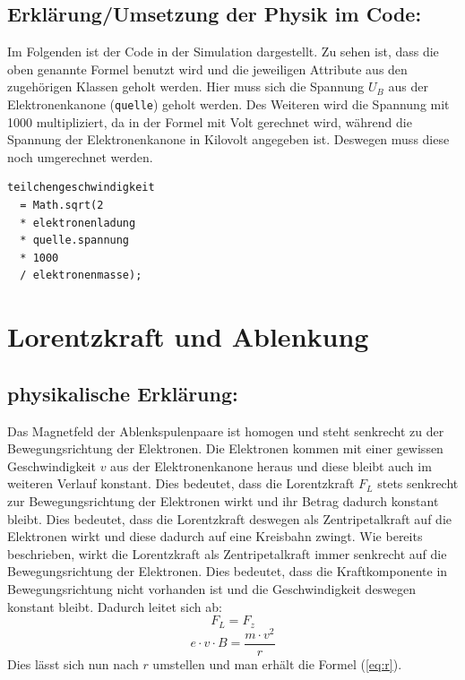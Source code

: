 \subsection{Erklärung/Umsetzung der Physik im Code:}

Im Folgenden ist der Code in der Simulation dargestellt.
Zu sehen ist, dass die oben genannte Formel benutzt wird und die jeweiligen Attribute aus den zugehörigen Klassen geholt werden.
Hier muss sich die Spannung $U_B$ aus der Elektronenkanone (\lstinline$quelle$)  geholt werden.
Des Weiteren wird die Spannung mit 1000 multipliziert, da in der Formel mit Volt gerechnet wird, während die Spannung der Elektronenkanone in Kilovolt angegeben ist. Deswegen muss diese noch umgerechnet werden.

\begin{lstlisting}
teilchengeschwindigkeit 
  = Math.sqrt(2 
  * elektronenladung 
  * quelle.spannung 
  * 1000 
  / elektronenmasse);
\end{lstlisting}

\section{Lorentzkraft und Ablenkung}

\subsection{physikalische Erklärung:}

Das Magnetfeld der Ablenkspulenpaare ist homogen und steht senkrecht zu der Bewegungsrichtung der Elektronen.
Die Elektronen kommen mit einer gewissen Geschwindigkeit $v$ aus der Elektronenkanone heraus und diese bleibt auch im weiteren Verlauf konstant.
Dies bedeutet, dass die Lorentzkraft $F_L$ stets senkrecht zur Bewegungsrichtung der Elektronen wirkt und ihr Betrag dadurch konstant bleibt.
Dies bedeutet, dass die Lorentzkraft deswegen als Zentripetalkraft auf die Elektronen wirkt und diese dadurch auf eine Kreisbahn zwingt.
Wie bereits beschrieben, wirkt die Lorentzkraft als Zentripetalkraft immer senkrecht auf die Bewegungsrichtung der Elektronen.
Dies bedeutet, dass die Kraftkomponente in Bewegungsrichtung nicht vorhanden ist und die Geschwindigkeit deswegen konstant bleibt.
Dadurch leitet sich ab: 
$$ F_L=F_z$$
$$ e \cdot v \cdot B = \frac{m \cdot v^2}{r}$$
Dies lässt sich nun nach $r$ umstellen und man erhält die Formel (\ref{eq:r}).   


